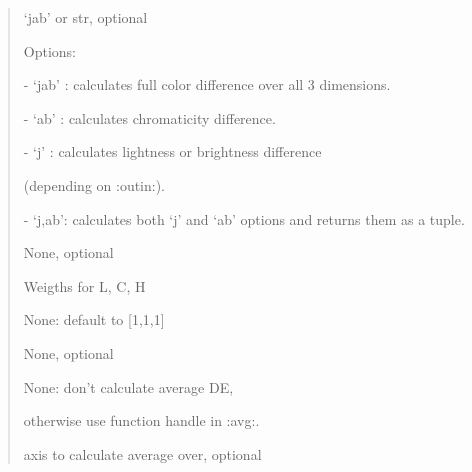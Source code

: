 \documentclass[letterpaper,10pt,english]{sphinxmanual}
\begin{document}
\begin{fulllineitems}
\begin{description}
\begin{quote}
\begin{description}
\item[{DEtype}] \leavevmode
\begin{DUlineblock}{0em}
\item[] ‘jab’ or str, optional
\item[] Options: 
\item[]
\begin{DUlineblock}{\DUlineblockindent}
\item[] - ‘jab’ : calculates full color difference over all 3 dimensions.
\item[] - ‘ab’  : calculates chromaticity difference.
\item[] - ‘j’   : calculates lightness or brightness difference 
\item[]
\begin{DUlineblock}{\DUlineblockindent}
\item[] (depending on :outin:).
\end{DUlineblock}
\item[] - ‘j,ab’: calculates both ‘j’ and ‘ab’ options 
and returns them as a tuple.
\end{DUlineblock}
\end{DUlineblock}

\item[{KLCH}] \leavevmode
\begin{DUlineblock}{0em}
\item[] None, optional
\item[] Weigths for L, C, H 
\item[] None: default to {[}1,1,1{]} 
\end{DUlineblock}

\item[{avg}] \leavevmode
\begin{DUlineblock}{0em}
\item[] None, optional
\item[] None: don’t calculate average DE, 
\item[]
\begin{DUlineblock}{\DUlineblockindent}
\item[] otherwise use function handle in :avg:.
\end{DUlineblock}
\end{DUlineblock}

\item[{avg\_axis}] \leavevmode
\begin{DUlineblock}{0em}
\item[] axis to calculate average over, optional
\end{DUlineblock}


\end{description}
\end{quote}
\end{description}
\end{fulllineitems}
\end{document}

